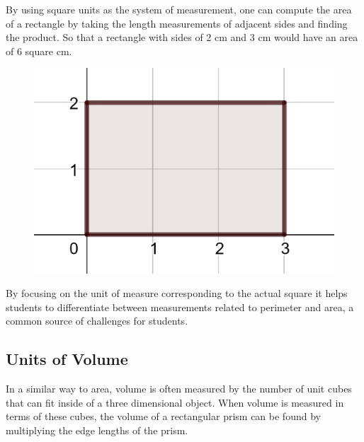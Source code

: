 \documentclass[
]{book}
\theoremstyle{definition}
\theoremstyle{definition}
\theoremstyle{definition}
\theoremstyle{definition}
\theoremstyle{remark}
\begin{document}
By using square units as the system of measurement, one can compute the area of a rectangle by taking the length measurements of adjacent sides and finding the product. So that a rectangle with sides of 2 cm and 3 cm would have an area of 6 square cm.

\begin{figure}

{\centering \includegraphics[width=0.3\linewidth]{images/area_units} 

}

\end{figure}

By focusing on the unit of measure corresponding to the actual square it helps students to differentiate between measurements related to perimeter and area, a common source of challenges for students.

\hypertarget{units-of-volume}{%
\subsection{Units of Volume}\label{units-of-volume}}

In a similar way to area, volume is often measured by the number of unit cubes that can fit inside of a three dimensional object. When volume is measured in terms of these cubes, the volume of a rectangular prism can be found by multiplying the edge lengths of the prism.
\end{document}

